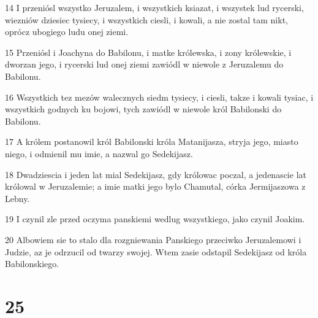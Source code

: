 \par 14 I przeniósl wszystko Jeruzalem, i wszystkich ksiazat, i wszystek lud rycerski, wiezniów dziesiec tysiecy, i wszystkich ciesli, i kowali, a nie zostal tam nikt, oprócz ubogiego ludu onej ziemi.
\par 15 Przeniósl i Joachyna do Babilonu, i matke królewska, i zony królewskie, i dworzan jego, i rycerski lud onej ziemi zawiódl w niewole z Jeruzalemu do Babilonu.
\par 16 Wszystkich tez mezów walecznych siedm tysiecy, i ciesli, takze i kowali tysiac, i wszystkich godnych ku bojowi, tych zawiódl w niewole król Babilonski do Babilonu.
\par 17 A królem postanowil król Babilonski króla Matanijasza, stryja jego, miasto niego, i odmienil mu imie, a nazwal go Sedekijasz.
\par 18 Dwadziescia i jeden lat mial Sedekijasz, gdy królowac poczal, a jedenascie lat królowal w Jeruzalemie; a imie matki jego bylo Chamutal, córka Jermijaszowa z Lebny.
\par 19 I czynil zle przed oczyma panskiemi wedlug wszystkiego, jako czynil Joakim.
\par 20 Albowiem sie to stalo dla rozgniewania Panskiego przeciwko Jeruzalemowi i Judzie, az je odrzucil od twarzy swojej. Wtem zasie odstapil Sedekijasz od króla Babilonskiego.

\chapter{25}

